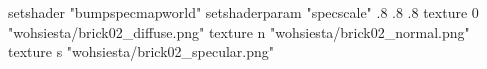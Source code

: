 setshader "bumpspecmapworld"
setshaderparam "specscale" .8 .8 .8
texture 0 "wohsiesta/brick02_diffuse.png"
texture n "wohsiesta/brick02_normal.png"
texture s "wohsiesta/brick02_specular.png"